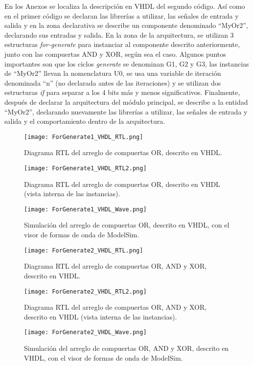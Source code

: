 En los Anexos se localiza la descripción en VHDL del segundo código. Así como en el primer código se declaran las librerías a utilizar, las señales de entrada y salida y en la zona declarativa se describe un componente denominado ``MyOr2'', declarando sus entradas y salida. En la zona de la arquitectura, se utilizan 3 estructuras \textit{for-generate} para instanciar al componente descrito anteriormente, junto con las compuertas AND y XOR, según sea el caso. Algunos puntos importantes son que los ciclos \textit{generate} se denominan G1, G2 y G3, las instancias de ``MyOr2'' llevan la nomenclatura U0, se usa una variable de iteración denominada ``n'' (no declarada antes de las iteraciones) y se utilizan dos estructuras \textit{if} para separar a los 4 bits más y menos significativos. Finalmente, después de declarar la arquitectura del módulo principal, se describe a la entidad ``MyOr2'', declarando nuevamente las librerías a utilizar, las señales de entrada y salida y el comportamiento dentro de la arquitectura.

\begin{figure}[ht]
	\centering
	\texttt{[image: ForGenerate1\_VHDL\_RTL.png]}
	\caption{Diagrama RTL del arreglo de compuertas OR, descrito en VHDL. \label{fig:forgenerate1_vhdl_rtl}}
\end{figure}

\begin{figure}[ht]
	\centering
	\texttt{[image: ForGenerate1\_VHDL\_RTL2.png]}
	\caption{Diagrama RTL del arreglo de compuertas OR, descrito en VHDL (vista interna de las instancias). \label{fig:forgenerate1_vhdl_rtl2}}
\end{figure}

\begin{figure}[ht]
	\centering
	\texttt{[image: ForGenerate1\_VHDL\_Wave.png]}
	\caption{Simulación del arreglo de compuertas OR, descrito en VHDL, con el visor de formas de onda de ModelSim. \label{fig:forgenerate1_vhdl_wave}}
\end{figure}

\begin{figure}[ht]
	\centering
	\texttt{[image: ForGenerate2\_VHDL\_RTL.png]}
	\caption{Diagrama RTL del arreglo de compuertas OR, AND y XOR, descrito en VHDL. \label{fig:forgenerate2_vhdl_rtl}}
\end{figure}

\begin{figure}[ht]
	\centering
	\texttt{[image: ForGenerate2\_VHDL\_RTL2.png]}
	\caption{Diagrama RTL del arreglo de compuertas OR, AND y XOR, descrito en VHDL (vista interna de las instancias). \label{fig:forgenerate2_vhdl_rtl2}}
\end{figure}

\begin{figure}[ht]
	\centering
	\texttt{[image: ForGenerate2\_VHDL\_Wave.png]}
	\caption{Simulación del arreglo de compuertas OR, AND y XOR, descrito en VHDL, con el visor de formas de onda de ModelSim. \label{fig:forgenerate2_vhdl_wave}}
\end{figure}